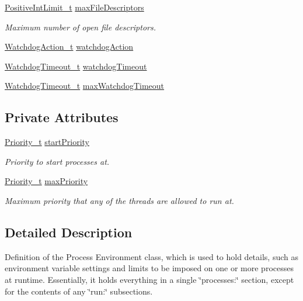 \begin{DoxyCompactItemize}
\hyperlink{struct_positive_int_limit__t}{Positive\+Int\+Limit\+\_\+t} \hyperlink{struct_process_env__t_a988754ace3b62b5cafe7e3da54722ace}{max\+File\+Descriptors}
\begin{DoxyCompactList}\small\item\em Maximum number of open file descriptors. \end{DoxyCompactList}\item 
\hyperlink{class_watchdog_action__t}{Watchdog\+Action\+\_\+t} \hyperlink{struct_process_env__t_a2b12640f90f7d662883ce75527bb50e1}{watchdog\+Action}
\item 
\hyperlink{class_watchdog_timeout__t}{Watchdog\+Timeout\+\_\+t} \hyperlink{struct_process_env__t_ae254647826f17492fc60581a5e6e933b}{watchdog\+Timeout}
\item 
\hyperlink{class_watchdog_timeout__t}{Watchdog\+Timeout\+\_\+t} \hyperlink{struct_process_env__t_ad23f2b3f155e2b6b292047d17831dc43}{max\+Watchdog\+Timeout}
\end{DoxyCompactItemize}
\subsection*{Private Attributes}
\begin{DoxyCompactItemize}
\item 
\hyperlink{class_priority__t}{Priority\+\_\+t} \hyperlink{struct_process_env__t_a2dd1829f351345d80cf38aaf39ede70d}{start\+Priority}
\begin{DoxyCompactList}\small\item\em Priority to start processes at. \end{DoxyCompactList}\item 
\hyperlink{class_priority__t}{Priority\+\_\+t} \hyperlink{struct_process_env__t_aad9abe880793f0ca5159b88a97914192}{max\+Priority}
\begin{DoxyCompactList}\small\item\em Maximum priority that any of the threads are allowed to run at. \end{DoxyCompactList}\end{DoxyCompactItemize}


\subsection{Detailed Description}
Definition of the Process Environment class, which is used to hold details, such as environment variable settings and limits to be imposed on one or more processes at runtime. Essentially, it holds everything in a single \char`\"{}processes\+:\char`\"{} section, except for the contents of any \char`\"{}run\+:\char`\"{} subsections.

